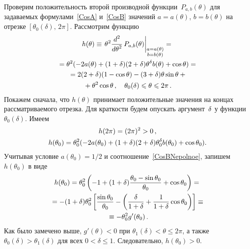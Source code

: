 \begin{multicols}{2}
Проверим положительность второй производной функции~$P_{a,b}(\theta)$
для задаваемых формулами~\eqref{CosA}
и~\eqref{CosB} значений ${a=a(\theta)}$, ${b=b(\theta)}$ на отрезке
$[\theta_0(\delta),\,2\pi]$. Рассмотрим функцию
\begin{multline*}
h(\theta)\equiv\left.
\theta^2\displaystyle\frac{\displaystyle d^2\mathstrut}{\displaystyle d\theta^2\mathstrut}\,P_{a,b}(\theta)\right\vert_{\substack{{a=a(\theta)}\\ {b=b(\theta)}}} ={}\\
 {}=
\theta^2(-2a(\theta)+(1+\delta)(2+\delta)\theta^{\delta}b(\theta)+\cos \theta)={}\\
{}=2(2+\delta)(1-\cos\theta)-
(3+\delta)\theta\sin\theta+{}\\
{}+\theta^2\cos\theta\,,\quad
\theta_0(\delta)\leqslant\theta\leqslant 2\pi\,.
\end{multline*}
Покажем сначала, что $h(\theta)$ принимает положительные значения на
концах рассматриваемого отрезка. Для краткости будем опускать
аргумент~$\delta$ у функции~$\theta_0(\delta)$. Имеем
\begin{gather*}
h(2\pi)=(2\pi)^2>0\,,\\
h(\theta_0)= \theta_0^2(-2a(\theta_0)+
(1+\delta)(2+\delta)\theta_0^{\delta}b(\theta_0)+\cos\theta_0).
\end{gather*}
Учитывая условие $a(\theta_0)=1/2$ и
соотношение~\eqref{CosBNepolnoe}, запишем $h(\theta_0)$ в виде
\begin{multline*}
h(\theta_0)=
\theta_0^2\left(
-1+(1+\delta)\displaystyle\frac{\displaystyle \theta_0-\sin\theta_0\mathstrut}{\displaystyle \theta_0\mathstrut}+
\cos\theta_0\right)={}\\
{}=
-(1+\delta)\theta_0^2\left[\displaystyle\frac{\displaystyle \sin\theta_0\mathstrut}{\displaystyle \theta_0\mathstrut}-
\left(\displaystyle\frac{\displaystyle \delta\mathstrut}{\displaystyle 1+\delta\mathstrut}+\displaystyle\frac{\displaystyle 1\mathstrut}{\displaystyle 1+\delta\mathstrut}\cos\theta_0\right)\right]\equiv{}\\
{}\equiv -\theta_0^2
g^\prime(\theta_0)\,.
\end{multline*}
Как было замечено выше, $g'(\theta)<0$ при
${\theta_1(\delta)<\theta\le2\pi}$, а также
$\theta_0(\delta)>\theta_1(\delta)$ для всех $0<\delta\le 1$.
Следовательно, $h(\theta_0)>0$.


\end{multicols}
